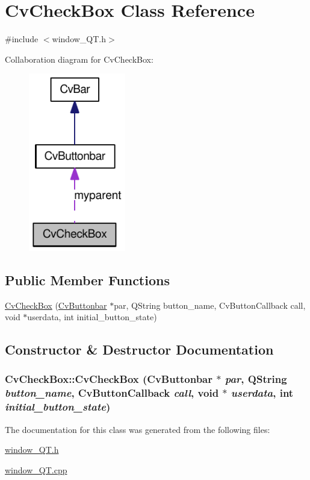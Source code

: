 \hypertarget{classCvCheckBox}{
\section{CvCheckBox Class Reference}
\label{classCvCheckBox}
}


{\ttfamily \#include $<$window\_\-QT.h$>$}



Collaboration diagram for CvCheckBox:\nopagebreak
\begin{figure}[H]
\begin{center}
\leavevmode
\includegraphics[width=120pt]{classCvCheckBox__coll__graph}
\end{center}
\end{figure}
\subsection*{Public Member Functions}
\begin{DoxyCompactItemize}
\item 
\hyperlink{classCvCheckBox_ad281545b29a827077ab4f4a4349bf582}{CvCheckBox} (\hyperlink{classCvButtonbar}{CvButtonbar} $\ast$par, QString button\_\-name, CvButtonCallback call, void $\ast$userdata, int initial\_\-button\_\-state)
\end{DoxyCompactItemize}


\subsection{Constructor \& Destructor Documentation}
\hypertarget{classCvCheckBox_ad281545b29a827077ab4f4a4349bf582}{
\subsubsection[{CvCheckBox}]{\setlength{\rightskip}{0pt plus 5cm}CvCheckBox::CvCheckBox ({\bf CvButtonbar} $\ast$ {\em par}, \/  QString {\em button\_\-name}, \/  CvButtonCallback {\em call}, \/  void $\ast$ {\em userdata}, \/  int {\em initial\_\-button\_\-state})}}
\label{classCvCheckBox_ad281545b29a827077ab4f4a4349bf582}


The documentation for this class was generated from the following files:\begin{DoxyCompactItemize}
\item 
\hyperlink{window__QT_8h}{window\_\-QT.h}\item 
\hyperlink{window__QT_8cpp}{window\_\-QT.cpp}\end{DoxyCompactItemize}
